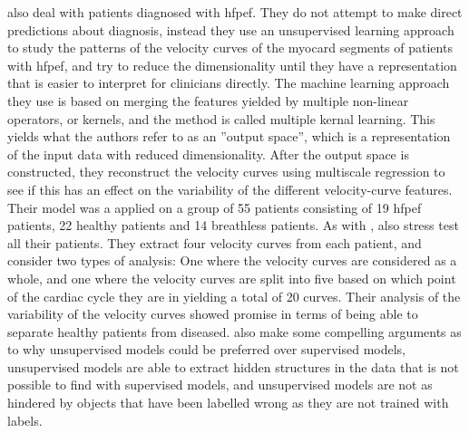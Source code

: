 \textcite{myocardial_motion_pattern} also deal with patients diagnosed with \acrshort{hfpef}. They do not attempt to make direct predictions about diagnosis, instead they use an unsupervised learning approach to study the patterns of the velocity curves of the myocard segments of patients with \acrshort{hfpef}, and try to reduce the dimensionality until they have a representation that is easier to interpret for clinicians directly. The machine learning approach they use is based on merging the features yielded by multiple non-linear operators, or kernels, and the method is called multiple kernal learning. This yields what the authors refer to as an ''output space'', which is a representation of the input data with reduced dimensionality. After the output space is constructed, they reconstruct the velocity curves using multiscale regression to see if this has an effect on the variability of the different velocity-curve features. Their model was a applied on a group of 55 patients consisting of 19 \acrshort{hfpef} patients, 22 healthy patients and 14 breathless patients. As with \textcite{hf_diagnosis_ml}, \textcite{myocardial_motion_pattern} also stress test all their patients. They extract four velocity curves from each patient, and consider two types of analysis: One where the velocity curves are considered as a whole, and one where the velocity curves are split into five based on which point of the cardiac cycle they are in yielding a total of 20 curves. Their analysis of the variability of the velocity curves showed promise in terms of being able to separate healthy patients from diseased. \textcite{myocardial_motion_pattern} also make some compelling arguments as to why unsupervised models could be preferred over supervised models, unsupervised models are able to extract hidden structures in the data that is not possible to find with supervised models, and unsupervised models are not as hindered by objects that have been labelled wrong as they are not trained with labels. \bigskip

